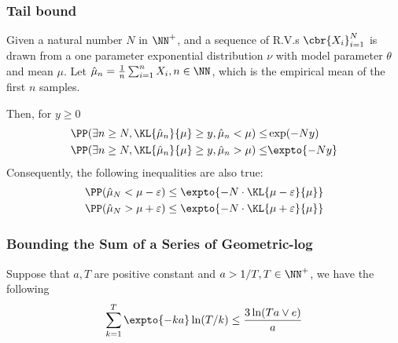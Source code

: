\subsubsection{Tail bound}
\begin{lemma}\citep{menard17minimax} \label{lemma:maximal-inequality}
     Given a natural number $N$ in $\NN^+$, and a sequence of R.V.s $\cbr{X_i}_{i=1}^N$ is drawn from a one parameter exponential distribution $\nu$ with model parameter $\theta$ and mean $\mu$. Let $\hmu_n = \frac{1}{n}\sum_{i=1}^n X_i, n \in \NN$, which is the empirical mean of the first $n$ samples.
     
     Then, for $y \geq 0$ 
    \begin{align}
        \PP(\exists n \geq N, \KL{\hmu_n}{\mu} \geq y, \hmu_n < \mu ) 
        \leq& 
        \exp(-N y) \label{eqn:maximal-inequality-lower}
        \\
        \PP(\exists n \geq N, \KL{\hmu_n}{\mu} \geq y, \hmu_n > \mu ) 
        \leq& 
        \expto{-N y} \label{eqn:maximal-inequality-upper}
    \end{align}
    Consequently, the following inequalities are also true:
    \begin{align}
        \PP(\hmu_N < \mu - \varepsilon ) 
        \leq 
        \expto{-N\cdot \KL{\mu - \varepsilon}{\mu}}
        \label{eqn:chernoff-lower-tail-bound}
        \\
        \PP(\hmu_N > \mu + \varepsilon ) 
        \leq 
        \expto{-N\cdot \KL{\mu + \varepsilon}{\mu}}
        \label{eqn:chernoff-upper-tail-bound}
    \end{align}
\end{lemma}
\subsubsection{Bounding the Sum of a Series of Geometric-log }
    \begin{lemma} \label{lemma:geo-log-sum}
        Suppose that $a, T$ are positive constant and $a > 1/T, T \in \NN^+$, we have the following
        \begin{align*}
            \sum_{k=1}^T \expto{-k a } \ln(T/k)
            \leq
            \frac{3\ln(Ta \vee e)}{a}
        \end{align*}
    \end{lemma}

